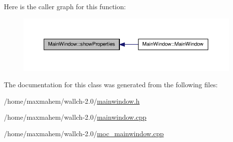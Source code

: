 Here is the caller graph for this function:
\nopagebreak
\begin{figure}[H]
\begin{center}
\leavevmode
\includegraphics[width=398pt]{classMainWindow_a4da9a80d3c5a312dde4fa246436d100f_icgraph}
\end{center}
\end{figure}




The documentation for this class was generated from the following files:\begin{DoxyCompactItemize}
\item 
/home/maxmahem/wallch-\/2.0/\hyperlink{mainwindow_8h}{mainwindow.h}\item 
/home/maxmahem/wallch-\/2.0/\hyperlink{mainwindow_8cpp}{mainwindow.cpp}\item 
/home/maxmahem/wallch-\/2.0/\hyperlink{moc__mainwindow_8cpp}{moc\_\-mainwindow.cpp}\end{DoxyCompactItemize}
